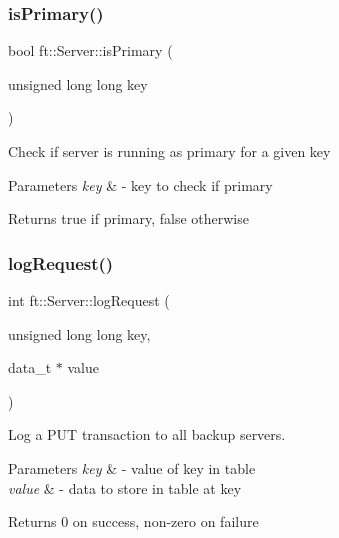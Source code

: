 \subsubsection{\texorpdfstring{is\+Primary()}{isPrimary()}}
{\footnotesize\ttfamily bool ft\+::\+Server\+::is\+Primary (\begin{DoxyParamCaption}\item[{unsigned long long}]{key }\end{DoxyParamCaption})}

Check if server is running as primary for a given key


\begin{DoxyParams}{Parameters}
{\em key} & -\/ key to check if primary\\
\hline
\end{DoxyParams}
\begin{DoxyReturn}{Returns}
true if primary, false otherwise 
\end{DoxyReturn}
\mbox{\label{classft_1_1Server_a17e80f813ff788007ece482e5d311ffa}} 
\subsubsection{\texorpdfstring{log\+Request()}{logRequest()}\hspace{0.1cm}{\footnotesize\ttfamily [1/3]}}
{\footnotesize\ttfamily int ft\+::\+Server\+::log\+Request (\begin{DoxyParamCaption}\item[{unsigned long long}]{key,  }\item[{data\+\_\+t $\ast$}]{value }\end{DoxyParamCaption})}

Log a P\+UT transaction to all backup servers.


\begin{DoxyParams}{Parameters}
{\em key} & -\/ value of key in table \\
\hline
{\em value} & -\/ data to store in table at key\\
\hline
\end{DoxyParams}
\begin{DoxyReturn}{Returns}
0 on success, non-\/zero on failure 
\end{DoxyReturn}
\mbox{\label{classft_1_1Server_ae97719e0790afb356374955130cb4c72}} 
